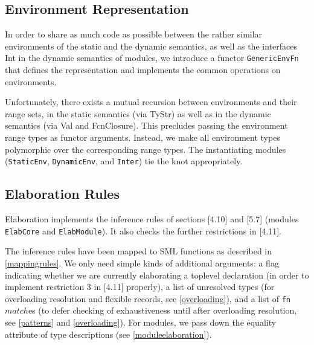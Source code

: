 \documentclass[twoside,titlepage]{article}
\newcommand{\void}[1]{}
\begin{document}
\subsection{Environment Representation}
\label{env}

In order to share as much code as possible between the rather similar environments of the static and the dynamic semantics, as well as the interfaces Int in the dynamic semantics of modules, we introduce a functor {\tt GenericEnvFn} that defines the representation and implements the common operations on environments.

Unfortunately, there exists a mutual recursion between environments and their range sets, in the static semantics (via TyStr) as well as in the dynamic semantics (via Val and FcnClosure). This precludes passing the environment range types as functor arguments. Instead, we make all environment types polymorphic over the corresponding range types. The instantiating modules ({\tt{StaticEnv}}, {\tt DynamicEnv}, and {\tt Inter}) tie the knot appropriately.

\void{
The introduction of higher-order modules (see Appendix \ref{ext-higherfunctors}) introduces a mutual recursion between the definition of structure environments StrEnv and modules Mod, which belong to the Core semantics, and functor signatures FunSig, which are part of the semantic objects for Modules. In order to avoid giving up the separation in the implementation, we use the dirty trick of wrapping functor signatures in an exception constructor, which allows hiding the {\tt FunSig} type in the definition of Core semantic objects. The same trick is used for the semantic objects of the dynamic semantics (with FunctorClosure instead of FunSig), and in the definition of binding environments for checking syntactic restrictions (Section \ref{restrictions}).

In the static semantics this also induces a mutual recursion on the value level, see Section \ref{matching}.
}


\subsection{Elaboration Rules}
\label{elaborationrules}

Elaboration implements the inference rules of sections [4.10] and [5.7] (modules {\tt ElabCore} and {\tt ElabModule}). It also checks the further restrictions in [4.11].

The inference rules have been mapped to SML functions as described in \ref{mappingrules}. We only need simple kinds of additional arguments: a flag indicating whether we are currently elaborating a toplevel declaration (in order to implement restriction 3 in [4.11] properly), a list of unresolved types (for overloading resolution and flexible records, see \ref{overloading}), and a list of {\tt fn} $\mathit{match}$es (to defer checking of exhaustiveness until after overloading resolution, see \ref{patterns} and \ref{overloading}). For modules, we pass down the equality attribute of type descriptions (see \ref{moduleelaboration}).
\end{document}

